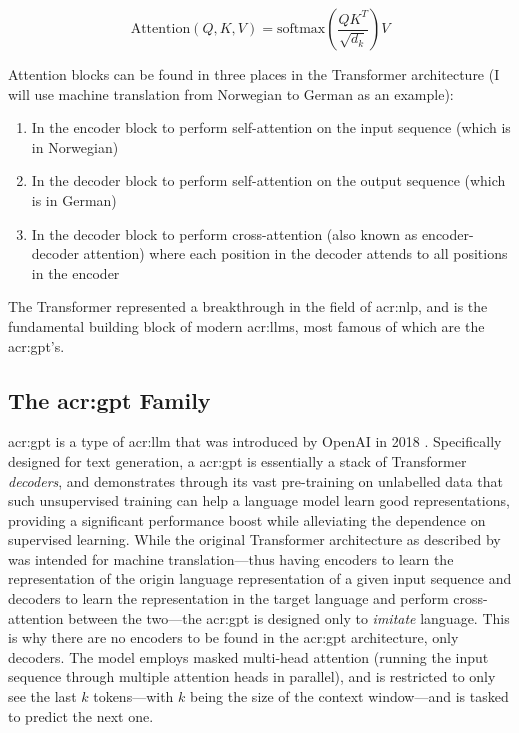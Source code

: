 \begin{equation}
    \text{Attention}(Q, K, V) = \text{softmax}\left(\frac{QK^T}{\sqrt{d_k}}\right)V
    \label{eq:attention}
\end{equation}

Attention blocks can be found in three places in the Transformer architecture \citep[5]{vaswaniAttentionAllYou2017} (I will use machine translation from Norwegian to German as an example):

\begin{enumerate}
    \item In the encoder block to perform self-attention on the input sequence (which is in Norwegian)
    \item In the decoder block to perform self-attention on the output sequence (which is in German)
    \item In the decoder block to perform cross-attention (also known as encoder-decoder attention) where each position in the decoder attends to all positions in the encoder
\end{enumerate}

The Transformer represented a breakthrough in the field of \gls{acr:nlp}, and is the fundamental building block of modern \glspl{acr:llm}, most famous of which are the \acrshort{acr:gpt}'s.

\subsection[The GPT Family]{The \acrshort{acr:gpt} Family}\label{subsec:gpt}

\gls{acr:gpt} is a type of \gls{acr:llm} that was introduced by OpenAI in 2018 \citep{radfordImprovingLanguageUnderstanding2018}. Specifically designed for text generation, a \acrshort{acr:gpt} is essentially a stack of Transformer \textit{decoders}, and demonstrates through its vast pre-training on unlabelled data that such unsupervised training can help a language model learn good representations, providing a significant performance boost while alleviating the dependence on supervised learning. While the original Transformer architecture as described by \cite{vaswaniAttentionAllYou2017} was intended for machine translation---thus having encoders to learn the representation of the origin language representation of a given input sequence and decoders to learn the representation in the target language and perform cross-attention between the two---the \acrshort{acr:gpt} is designed only to \textit{imitate} language. This is why there are no encoders to be found in the \acrshort{acr:gpt} architecture, only decoders. The model employs masked multi-head attention (running the input sequence through multiple attention heads in parallel), and is restricted to only see the last $k$ tokens---with $k$ being the size of the context window---and is tasked to predict the next one.


